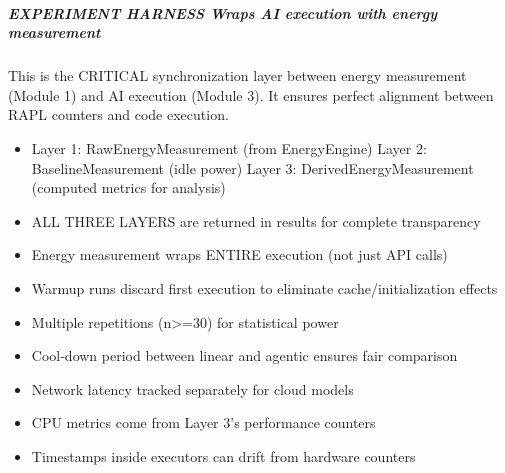 \documentclass[letterpaper,10pt,english]{sphinxmanual}
\begin{document}
\subparagraph{EXPERIMENT HARNESS \textendash{} Wraps AI execution with energy measurement}
\label{\detokenize{core.execution.harness:experiment-harness-wraps-ai-execution-with-energy-measurement}}\begin{description}
\sphinxAtStartPar
This is the CRITICAL synchronization layer between energy measurement
(Module 1) and AI execution (Module 3). It ensures perfect alignment
between RAPL counters and code execution.

\begin{itemize}
\item {} \begin{description}
\sphinxAtStartPar
Layer 1: RawEnergyMeasurement (from EnergyEngine)
Layer 2: BaselineMeasurement (idle power)
Layer 3: DerivedEnergyMeasurement (computed metrics for analysis)

\end{description}

\item {} 
\sphinxAtStartPar
ALL THREE LAYERS are returned in results for complete transparency

\item {} 
\sphinxAtStartPar
Energy measurement wraps ENTIRE execution (not just API calls)

\item {} 
\sphinxAtStartPar
Warmup runs discard first execution to eliminate cache/initialization effects

\item {} 
\sphinxAtStartPar
Multiple repetitions (n\textgreater{}=30) for statistical power

\item {} 
\sphinxAtStartPar
Cool‑down period between linear and agentic ensures fair comparison

\item {} 
\sphinxAtStartPar
Network latency tracked separately for cloud models

\item {} 
\sphinxAtStartPar
CPU metrics come from Layer 3’s performance counters

\end{itemize}

\begin{itemize}
\item {} 
\sphinxAtStartPar
Timestamps inside executors can drift from hardware counters


\end{itemize}
\end{description}
\end{document}
